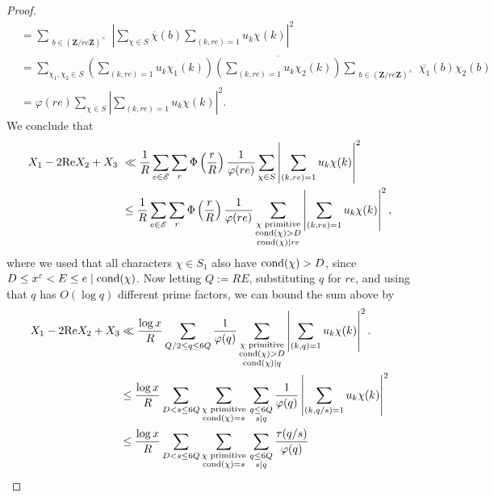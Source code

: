 \documentclass[reqno,11pt]{amsart}
\theoremstyle{definition}
\theoremstyle{remark}
\numberwithin{equation}{section}
\newcommand{\Z}{\mathbf{Z}}
\newcommand{\msE}{\mathscr{E}}
\renewcommand{\Re}{\textnormal{Re}}
\newcommand{\eps}{\varepsilon}
\renewcommand{\bar}{\overline}
\newcommand{\cond}{\textnormal{cond}}
\begin{document}
\begin{proof}
\[\begin{aligned}
    &=
    \sum_{\substack{b \in (\Z/re\Z)^\times}} \left\vert \sum_{\chi \in S} \bar{\chi}(b) \sum_{(k,re)=1} u_k \chi(k) \right\vert^2
    \\
    &=
    \sum_{\chi_1,\chi_2 \in S} \left(\sum_{(k,re)=1} u_k \chi_1(k)\right)\bar{\left(\sum_{(k,re)=1} u_k \chi_2(k)\right)} \sum_{\substack{b \in (\Z/re\Z)^\times}} \bar{\chi_1}(b) \chi_2(b) 
    \\
    &=
    \varphi(re) \sum_{\chi \in S} \left\vert \sum_{(k,re)=1} u_k \chi(k)\right\vert^2.
\end{aligned}    
\]
We conclude that
\[
\begin{aligned}
    X_1 - 2\Re X_2 + X_3 
    \ &\ll  
    \frac{1}{R}\sum_{e \in \msE} \sum_r \Phi\left(\frac{r}{R}\right) \frac{1}{\varphi(re)}  \sum_{\chi \in S} \left\vert \sum_{(k,re)=1} u_k \chi(k)\right\vert^2
    \\
    &\le
    \frac{1}{R}\sum_{e \in \msE} \sum_r \Phi\left(\frac{r}{R}\right) \frac{1}{\varphi(re)}  \sum_{\substack{\chi \text{ primitive} \\ \cond(\chi) > D \\ \cond(\chi) \mid re}} \left\vert \sum_{(k,re)=1} u_k \chi(k)\right\vert^2,
\end{aligned}
\]
where we used that all characters $\chi \in S_1$ also have $\cond(\chi) > D$, since $D \le x^\eps < E \le e \mid \cond(\chi)$. Now letting $Q := RE$, substituting $q$ for $re$, and using that $q$ has $O(\log q)$ different prime factors, we can bound the sum above by 
\[
\begin{aligned}
    X_1 - 2\Re X_2 + X_3 
    &\ll
    \frac{\log x}{R}\sum_{Q/2 \le q \le 6Q} \frac{1}{\varphi(q)} \sum_{\substack{\chi \text{ primitive} \\ \cond(\chi) > D \\ \cond(\chi) \mid q}} \left\vert \sum_{(k,q)=1} u_k \chi(k)\right\vert^2.
    \\
    &\le
    \frac{\log x}{R}
    \sum_{D < s \le 6Q}
    \sum_{\substack{\chi \text{ primitive} \\ \cond(\chi) = s}}\,
    \sum_{\substack{q \le 6Q \\ s \mid q}}
    \frac{1}{\varphi(q)} \left\vert \sum_{(k,q/s)=1} u_k \chi(k)\right\vert^2
    \\
    &\le 
    \frac{\log x}{R}
    \sum_{D < s \le 6Q}
    \sum_{\substack{\chi \text{ primitive} \\ \cond(\chi) = s}}\,
    \sum_{\substack{q \le 6Q \\ s \mid q}}
    \frac{\tau(q/s)}{\varphi(q)} 

\end{aligned}\]
\end{proof}
\end{document}
